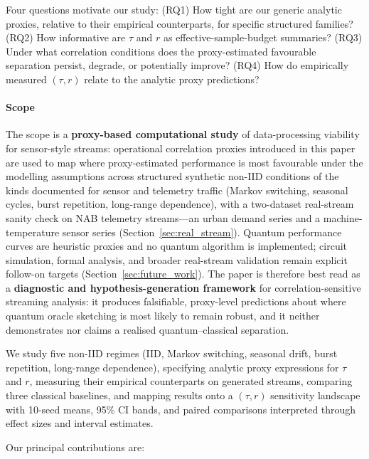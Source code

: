 \documentclass[sensors,article,submit,pdftex,moreauthors]{Definitions/mdpi}
\begin{document}
Four questions motivate our study: (RQ1) How tight are our generic analytic proxies, relative to their empirical counterparts, for specific structured families? (RQ2) How informative are $\tau$ and $r$ as effective-sample-budget summaries? (RQ3) Under what correlation conditions does the proxy-estimated favourable separation persist, degrade, or potentially improve? (RQ4) How do empirically measured $(\tau, r)$ relate to the analytic proxy predictions?

\paragraph{Scope} The scope is a \textbf{proxy-based computational study} of data-processing viability for sensor-style streams: operational correlation proxies introduced in this paper are used to map where proxy-estimated performance is most favourable under the modelling assumptions across structured synthetic non\nobreakdash-IID conditions of the kinds documented for sensor and telemetry traffic (Markov switching, seasonal cycles, burst repetition, long-range dependence), with a two\nobreakdash-dataset real-stream sanity check on NAB telemetry streams---an urban demand series and a machine-temperature sensor series (Section~\ref{sec:real_stream}). Quantum performance curves are heuristic proxies and no quantum algorithm is implemented; circuit simulation, formal analysis, and broader real-stream validation remain explicit follow-on targets (Section~\ref{sec:future_work}). The paper is therefore best read as a \textbf{diagnostic and hypothesis-generation framework} for correlation-sensitive streaming analysis: it produces falsifiable, proxy-level predictions about where quantum oracle sketching is most likely to remain robust, and it neither demonstrates nor claims a realised quantum--classical separation.

We study five non\nobreakdash-IID regimes (IID, Markov switching, seasonal drift, burst repetition, long-range dependence), specifying analytic proxy expressions for $\tau$ and $r$, measuring their empirical counterparts on generated streams, comparing three classical baselines, and mapping results onto a $(\tau, r)$ sensitivity landscape with 10-seed means, 95\% CI bands, and paired comparisons interpreted through effect sizes and interval estimates.

Our principal contributions are:
\end{document}
